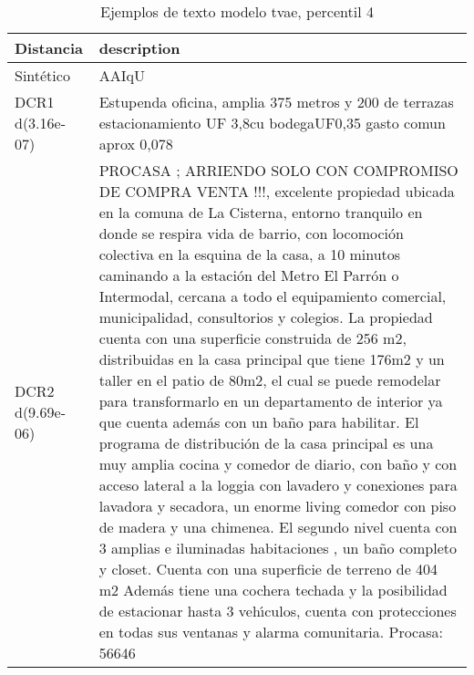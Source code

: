 \begin{table}[H]
\centering
\fontsize{10}{14}\selectfont
\caption{Ejemplos de texto modelo tvae, percentil 4}
\label{table-example-economicos-a-2-tvae-4p-text}
\begin{tabular}{|l|m{35em}|}
\hline
\rowcolor[gray]{0.8}
Distancia & description \\
\hline Sintético & AAIqU \\
\hline DCR1 d(3.16e-07) & Estupenda oficina, amplia 375 metros y 200 de terrazas
estacionamiento UF 3,8cu
bodegaUF0,35
gasto comun aprox 0,078 \\
\hline DCR2 d(9.69e-06) & PROCASA  ; ARRIENDO SOLO CON COMPROMISO DE COMPRA VENTA !!!, excelente propiedad ubicada en la comuna de La Cisterna, entorno tranquilo en donde se respira vida de barrio, con locomoci\'on colectiva en la esquina de la casa, a 10 minutos caminando a la estaci\'on del Metro El Parr\'on o Intermodal, cercana a todo el equipamiento comercial, municipalidad, consultorios y colegios.    La propiedad cuenta con una superficie construida de 256 m2, distribuidas en la casa principal que tiene 176m2 y un taller en el patio de 80m2, el cual se puede remodelar para transformarlo en un departamento de interior ya que cuenta adem\'as con un ba\~no para habilitar.    El programa de distribuci\'on de la casa principal es una muy amplia cocina y comedor de diario, con ba\~no y con acceso lateral a la loggia con lavadero y conexiones para lavadora y secadora, un enorme living comedor con piso de madera y una chimenea.    El segundo nivel cuenta con 3 amplias e iluminadas habitaciones , un ba\~no completo y closet.    Cuenta con una superficie de terreno de 404 m2    Adem\'as tiene una cochera techada y la posibilidad de estacionar hasta 3 veh{\'\i}culos, cuenta con protecciones en todas sus ventanas y alarma comunitaria.  Procasa: 56646 \\
\hline
\end{tabular}
\end{table}

